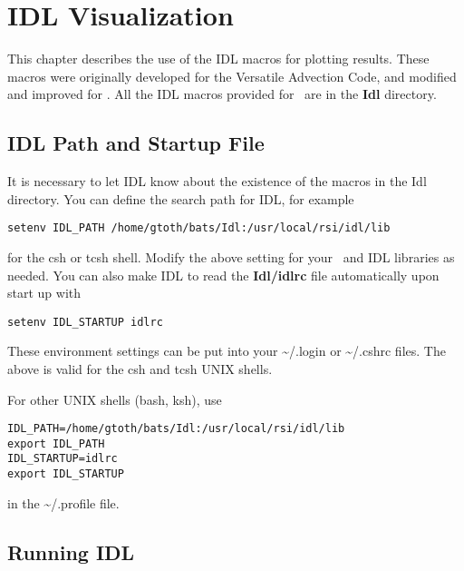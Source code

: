 %

\section{IDL Visualization \label{section:idl_visualization}}

This chapter describes the use of the IDL macros for plotting results.
These macros were originally developed for the Versatile Advection Code,
and modified and improved for \BATSRUS. 
All the IDL macros provided for \BATSRUS\ are in the {\bf Idl} directory.

\subsection{IDL Path and Startup File \label{s-idl-path}}

   It is necessary to let IDL know about the existence of the macros in the 
   Idl directory.  You can define the search path for IDL, for example
\begin{verbatim}
setenv IDL_PATH /home/gtoth/bats/Idl:/usr/local/rsi/idl/lib
\end{verbatim}
   for the csh or tcsh shell. Modify the above setting for
   your \BATSRUS\ and IDL libraries as needed. You can also make IDL to read 
   the {\bf Idl/idlrc} file automatically upon start up with
\begin{verbatim}
setenv IDL_STARTUP idlrc
\end{verbatim}
   These environment settings can be put into your \~{}/.login or \~{}/.cshrc 
   files. The above is valid for the csh and tcsh UNIX shells. 

   For other UNIX shells (bash, ksh), use
\begin{verbatim}
IDL_PATH=/home/gtoth/bats/Idl:/usr/local/rsi/idl/lib
export IDL_PATH
IDL_STARTUP=idlrc
export IDL_STARTUP
\end{verbatim}
   in the \~{}/.profile file.

\subsection{Running IDL \label{s-run-idl}}


